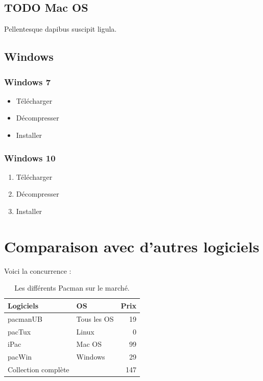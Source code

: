 \documentclass[11pt]{article}
\begin{document}
\subsection{{\bfseries\sffamily TODO} Mac OS}
\label{sec:org016725c}
Pellentesque dapibus suscipit ligula.

\subsection{Windows}
\label{sec:org8adb8f2}
\subsubsection{Windows 7}
\label{sec:org7bf8ba8}
\begin{itemize}
\item Télécharger
\item Décompresser
\item Installer
\end{itemize}

\subsubsection{Windows 10}
\label{sec:org106850d}
\begin{enumerate}
\item Télécharger
\item Décompresser
\item Installer
\end{enumerate}

\section{Comparaison avec d'autres logiciels}
\label{sec:org71f7734}
Voici la concurrence :

\begin{table}[htbp]
\centering
\begin{tabular}{llr}
\hline
Logiciels & OS & Prix\\
\hline
pacmanUB & Tous les OS & 19\\
pacTux & Linux & 0\\
iPac & Mac OS & 99\\
pacWin & Windows & 29\\
\hline
Collection complète &  & 147\\
\hline
\end{tabular}
\caption{Les différents Pacman sur le marché. \label{tab-concur}}

\end{table}
\end{document}
